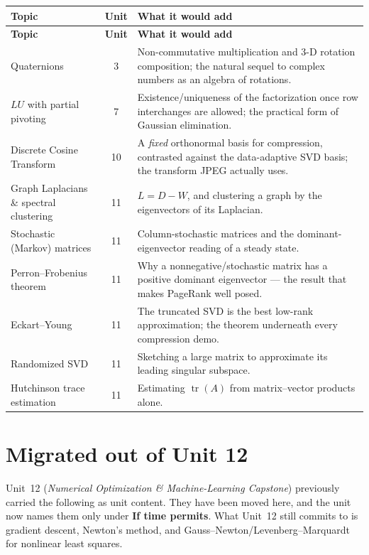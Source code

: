 \documentclass[11pt]{article}
\begin{document}
{\renewcommand{\arraystretch}{1.45}
\begin{longtable}{@{}p{4.4cm} c p{9.0cm}@{}}
\toprule
\textbf{Topic} & \textbf{Unit} & \textbf{What it would add} \\
\midrule
\endfirsthead
\toprule
\textbf{Topic} & \textbf{Unit} & \textbf{What it would add} \\
\midrule
\endhead
Quaternions & 3 &
  Non-commutative multiplication and 3-D rotation composition; the natural
  sequel to complex numbers as an algebra of rotations. \\
$LU$ with partial pivoting & 7 &
  Existence/uniqueness of the factorization once row interchanges are allowed;
  the practical form of Gaussian elimination. \\
Discrete Cosine Transform & 10 &
  A \emph{fixed} orthonormal basis for compression, contrasted against the
  data-adaptive SVD basis; the transform JPEG actually uses. \\
Graph Laplacians \& spectral clustering & 11 &
  $L = D - W$, and clustering a graph by the eigenvectors of its Laplacian. \\
Stochastic (Markov) matrices & 11 &
  Column-stochastic matrices and the dominant-eigenvector reading of a
  steady state. \\
Perron--Frobenius theorem & 11 &
  Why a nonnegative/stochastic matrix has a positive dominant eigenvector ---
  the result that makes PageRank well posed. \\
Eckart--Young & 11 &
  The truncated SVD is the best low-rank approximation; the theorem underneath
  every compression demo. \\
Randomized SVD & 11 &
  Sketching a large matrix to approximate its leading singular subspace. \\
Hutchinson trace estimation & 11 &
  Estimating $\operatorname{tr}(A)$ from matrix--vector products alone. \\
\bottomrule
\end{longtable}}

\section{Migrated out of Unit 12}
Unit~12 (\emph{Numerical Optimization \& Machine-Learning Capstone}) previously
carried the following as unit content. They have been moved here, and the unit
now names them only under \textbf{If time permits}. What Unit~12 still commits
to is gradient descent, Newton's method, and Gauss--Newton/Levenberg--Marquardt
for nonlinear least squares.
\end{document}
